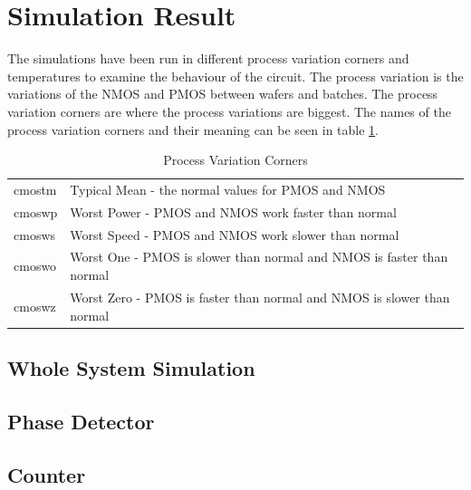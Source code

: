 \documentclass[a4paper,12pt]{article} \usepackage{graphicx}
\begin{document}
\section{Simulation Result}
The simulations have been run in different process variation corners and
temperatures to examine the behaviour of the circuit. The process variation is
the variations of the NMOS and PMOS between wafers and batches. 
The process variation corners are where the process variations are biggest.
The names of the process variation corners and their meaning can be seen in
table \ref{tab:corners}.

\begin{table}[h!]
        \centering
        \begin{tabular}{|l|l|}
                \hline 
                cmostm & Typical Mean - the normal values for PMOS and NMOS \\
                cmoswp & Worst Power - PMOS and NMOS work faster than normal \\
                cmosws & Worst Speed - PMOS and NMOS work slower than normal \\
                cmoswo & Worst One - PMOS is slower than normal and NMOS is
                faster than normal \\
                cmoswz & Worst Zero - PMOS is faster than normal and NMOS is
                slower than normal \\
                \hline
        \end{tabular}
        \caption{Process Variation Corners}
        \label{tab:corners}
\end{table}

\subsection{Whole System Simulation}
\subsection{Phase Detector}
\subsection{Counter}
\end{document}
